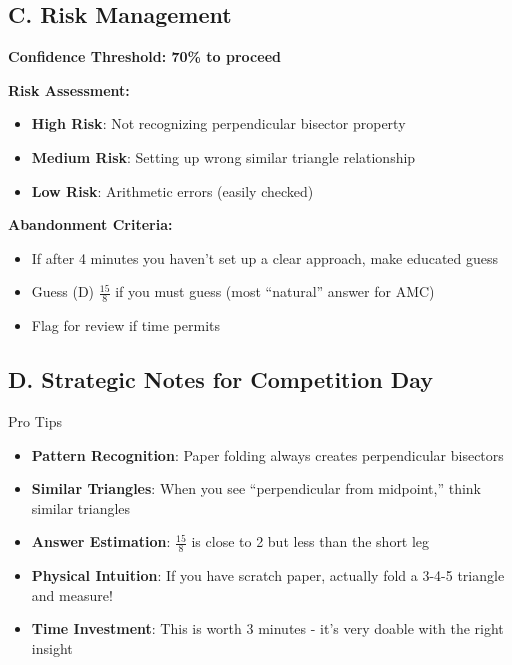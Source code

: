 \documentclass[12pt]{article}
\begin{document}
\begin{competitionbox}
\subsection*{C. Risk Management}

\textbf{Confidence Threshold: 70\% to proceed}

\textbf{Risk Assessment:}
\begin{itemize}
    \item \textbf{High Risk}: Not recognizing perpendicular bisector property
    \item \textbf{Medium Risk}: Setting up wrong similar triangle relationship
    \item \textbf{Low Risk}: Arithmetic errors (easily checked)
\end{itemize}

\textbf{Abandonment Criteria:}
\begin{itemize}
    \item If after 4 minutes you haven't set up a clear approach, make educated guess
    \item Guess (D) $\frac{15}{8}$ if you must guess (most ``natural'' answer for AMC)
    \item Flag for review if time permits
\end{itemize}

\subsection*{D. Strategic Notes for Competition Day}

\begin{highlightbox}{Pro Tips}
\begin{itemize}
    \item \textbf{Pattern Recognition}: Paper folding always creates perpendicular bisectors
    \item \textbf{Similar Triangles}: When you see ``perpendicular from midpoint,'' think similar triangles
    \item \textbf{Answer Estimation}: $\frac{15}{8}$ is close to 2 but less than the short leg
    \item \textbf{Physical Intuition}: If you have scratch paper, actually fold a 3-4-5 triangle and measure!
    \item \textbf{Time Investment}: This is worth 3 minutes - it's very doable with the right insight
\end{itemize}
\end{highlightbox}

\end{competitionbox}
\end{document}
